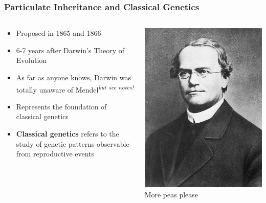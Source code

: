 \documentclass{beamer}
\begin{document}
\begin{frame}
	
	\frametitle{Particulate Inheritance and Classical Genetics}
	
	\begin{columns}[T]
		
		\begin{column}{0.6\textwidth}
			
			\begin{itemize}
				\item Proposed in 1865 and 1866
				\item 6-7 years after Darwin’s Theory of Evolution
				\item As far as anyone knows, Darwin was totally unaware of Mendel\textsuperscript{\textit{but see notes!}}
				\vspace{20pt}
				\item Represents the foundation of classical genetics
				\item \textbf{Classical genetics} refers to the study of genetic patterns observable from reproductive events
			\end{itemize}
			
			
		\end{column}
		\begin{column}{.4\textwidth}
			\includegraphics[keepaspectratio, width  =\textwidth]{img/mendel}
			\centering
			More peas please
		\end{column}
		

\end{columns}
\end{frame}
\end{document}
